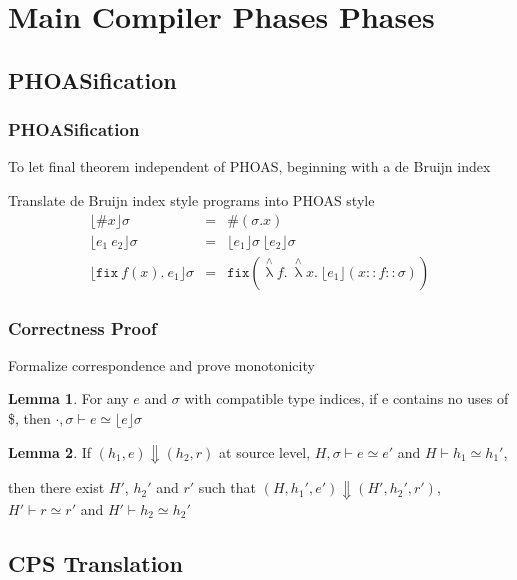 \documentclass[dvipdfmx,cjk,xcolor=dvipsnames,envcountsect,notheorems,aspectratio=169]{beamer}
\theoremstyle{definition}
\newtheorem{lemma}{Lemma}
\newcommand{\FIX}{\texttt{fix}}
\newcommand{\METALAMBDA}{\mathop{\lambda}\limits^\wedge}
\begin{document}
\section{Main Compiler Phases Phases}

\subsection{PHOASification}

\begin{frame}
	\frametitle{PHOASification}
	\LARGE To let final theorem independent of PHOAS, beginning with a de Bruijn index

	Translate de Bruijn index style programs into PHOAS style
	{\Large \[
		\begin{array}{rcl}
			\lfloor \# x \rfloor \sigma & = & \#(\sigma . x) \\
			\lfloor e_1~e_2 \rfloor \sigma & = & \lfloor e_1 \rfloor \sigma ~ \lfloor e_2 \rfloor \sigma \\
			\lfloor \FIX~f(x).~e_1 \rfloor \sigma & = & \FIX(\METALAMBDA f.~\METALAMBDA x.~ \lfloor e_1 \rfloor (x :: f :: \sigma))
		\end{array}
	\]}
\end{frame}

\begin{frame}
	\frametitle{Correctness Proof}
	\LARGE Formalize correspondence and prove monotonicity
	{\Large \begin{lemma}
		For any $e$ and $\sigma$ with compatible type indices, if e contains no uses of \$, then $\cdot, \sigma \vdash e \simeq \lfloor e \rfloor \sigma$
	\end{lemma}

	\begin{lemma}
		If $(h_1, e) \Downarrow (h_2, r)$ at source level, $H, \sigma \vdash e \simeq e'$ and $H \vdash h_1 \simeq h_1'$,

		then there exist $H'$, $h_2'$ and $r'$ such that
		$(H, h_1', e') \Downarrow (H', h_2', r')$, $H' \vdash r \simeq r'$ and $H' \vdash h_2 \simeq h_2'$
	\end{lemma}}
\end{frame}

\subsection{CPS Translation}
\end{document}
